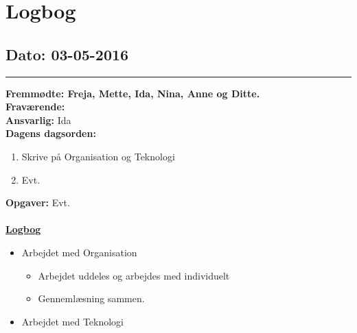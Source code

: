 \chapter{Logbog}
\section{Dato: 03-05-2016}
\hrule
\textbf{Fremmødte: Freja, Mette, Ida, Nina, Anne og Ditte.} \\
\textbf{Fraværende: } \\
\textbf{Ansvarlig: } Ida \\
\textbf{Dagens dagsorden: }
\begin{enumerate}
	\item Skrive på Organisation og Teknologi
	\item Evt. 
\end{enumerate}

\textbf{Opgaver:} \newline
Evt. \\\\
\underline{\textbf{Logbog}}
\begin{itemize}
\item Arbejdet med Organisation
\begin{itemize}
\item Arbejdet uddeles og arbejdes med individuelt
\item Gennemlæsning sammen.
\end{itemize}
\item Arbejdet med Teknologi
\end{itemize}
